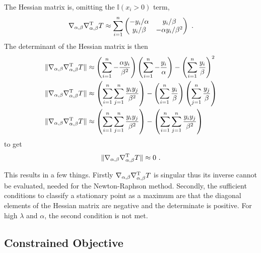 The Hessian matrix is, omitting the $\mathbb{I}(x_i>0)$ term,
\begin{equation}
  \nabla_{\alpha,\beta}\nabla_{\alpha,\beta}^\textup{T} T \approx
  \sum_{i=1}^n
  \begin{pmatrix}
    -y_i/\alpha  & y_i/\beta \\
    y_i/\beta & -\alpha y_i/\beta^2
  \end{pmatrix}
  \ . 
\end{equation}
The determinant of the Hessian matrix is then
\begin{align*}
  \|\nabla_{\alpha,\beta}\nabla_{\alpha,\beta}^\textup{T} T\|
  &\approx
  \left(\sum_{i=1}^n-\frac{\alpha y_i}{\beta^2}\right)
  \left(\sum_{i=1}^n-\frac{y_i}{\alpha}\right) - \left(\sum_{i=1}^n\frac{y_i}{\beta}\right)^2
  \\
  \|\nabla_{\alpha,\beta}\nabla_{\alpha,\beta}^\textup{T} T\|
  &\approx
  \left(\sum_{i=1}^n\sum_{j=1}^n\frac{y_iy_j}{\beta^2}\right)
   - \left(\sum_{i=1}^n\frac{y_i}{\beta}\right)\left(\sum_{j=1}^n\frac{y_j}{\beta}\right)
  \\
  \|\nabla_{\alpha,\beta}\nabla_{\alpha,\beta}^\textup{T} T\|
  &\approx
  \left(\sum_{i=1}^n\sum_{j=1}^n\frac{y_iy_j}{\beta^2}\right)
   - \left(\sum_{i=1}^n\sum_{j=1}^n\frac{y_iy_j}{\beta^2}\right)
\end{align*}
to get
\begin{equation}
  \|\nabla_{\alpha,\beta}\nabla_{\alpha,\beta}^\textup{T} T\|
  \approx
  0
  \ .
\end{equation}

This results in a few things. Firstly $\nabla_{\alpha,\beta}\nabla_{\alpha,\beta}^\textup{T} T$ is singular thus its inverse cannot be evaluated, needed for the Newton-Raphson method. Secondly, the sufficient conditions to classify a stationary point as a maximum are that the diagonal elements of the Hessian matrix are negative and the determinate is positive. For high $\lambda$ and $\alpha$, the second condition is not met.

\subsection{Constrained Objective}

